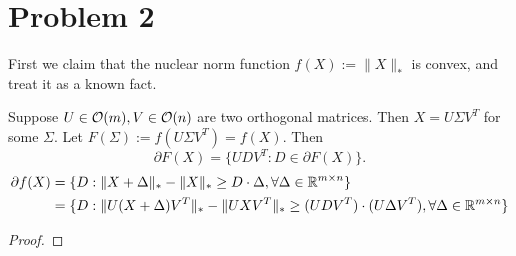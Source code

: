\section{Problem 2}

First we claim that the nuclear norm function $f(X):=\|X\|_*$ is convex,
and treat it as a known fact.

Suppose $U\in\mathcal{O}(m), V\in\mathcal{O}(n)$ are two orthogonal matrices.
Then $X=U\Sigma V^T$ for some $\Sigma$.
Let $F(\Sigma):=f(U\Sigma V^T)=f(X)$.
Then
\begin{equation}
    \partial F(X) = \{UDV^T:D\in\partial F(X)\}.
\end{equation}
\begin{equation}
\begin{split}
    \partial f(X)
        &=\{D:\|X+\Delta\|_*-\|X\|_*\ge D\cdot\Delta, \forall\Delta\in{\mathbb{R}}^{m\times n}\} \\
        &=\{D:\|U(X+\Delta)V^T\|_*-\|UXV^T\|_*\ge (UDV^T)\cdot(U\Delta V^T), \forall\Delta\in{\mathbb{R}}^{m\times n}\}
\end{split}
\end{equation}

\begin{claim}

\end{claim}
\begin{proof}

\end{proof}
